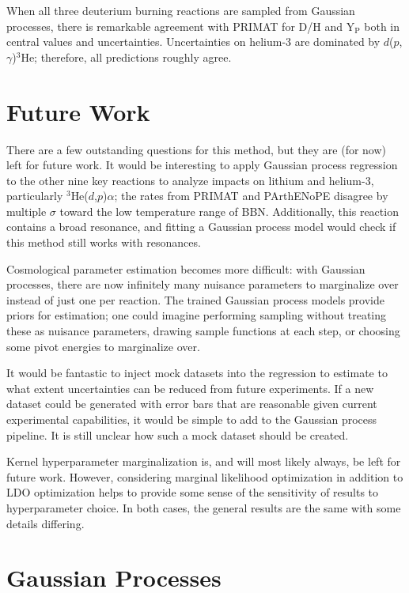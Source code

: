 \documentclass[%
 reprint,
superscriptaddress,
nofootinbib,
 amsmath,amssymb,
 aps,
 pra,
]{revtex4-2}
\begin{document}
When all three deuterium burning reactions are sampled from Gaussian processes, there is remarkable agreement with PRIMAT for D/H and Y$_\text{P}$ both in central values and uncertainties. Uncertainties on helium-3 are dominated by $d$($p$,$\gamma$)$^3$He; therefore, all predictions roughly agree. 



\section{Future Work}



There are a few outstanding questions for this method, but they are (for now) left for future work. It would be interesting to apply Gaussian process regression to the other nine key reactions to analyze impacts on lithium and helium-3, particularly $^3$He($d$,$p$)$\alpha$; the rates from PRIMAT and PArthENoPE disagree by multiple $\sigma$ toward the low temperature range of BBN. Additionally, this reaction contains a broad resonance, and fitting a Gaussian process model would check if this method still works with resonances. 

Cosmological parameter estimation becomes more difficult: with Gaussian processes, there are now infinitely many nuisance parameters to marginalize over instead of just one per reaction. The trained Gaussian process models provide priors for estimation; one could imagine performing sampling without treating these as nuisance parameters, drawing sample functions at each step, or choosing some pivot energies to marginalize over. 

It would be fantastic to inject mock datasets into the regression to estimate to what extent uncertainties can be reduced from future experiments. If a new dataset could be generated with error bars that are reasonable given current experimental capabilities, it would be simple to add to the Gaussian process pipeline. It is still unclear how such a mock dataset should be created. 

Kernel hyperparameter marginalization is, and will most likely always, be left for future work. However, considering marginal likelihood optimization in addition to LDO optimization helps to provide some sense of the sensitivity of results to hyperparameter choice. In both cases, the general results are the same with some details differing. 



\section{Gaussian Processes}
\end{document}
